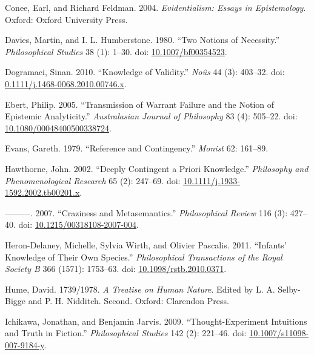 \documentclass[
  10pt,
  letterpaper,
  DIV=11,
  numbers=noendperiod,
  twoside]{scrartcl}
\newlength{\cslhangindent}
\newenvironment{CSLReferences}[2] %
 {\begin{list}{}{%
  \setlength{\itemindent}{0pt}
  \setlength{\leftmargin}{0pt}
  \setlength{\parsep}{0pt}
  \ifodd #1
   \setlength{\leftmargin}{\cslhangindent}
   \setlength{\itemindent}{-1\cslhangindent}
  \fi
  \setlength{\itemsep}{#2\baselineskip}}}
 {\end{list}}
\begin{document}
\begin{CSLReferences}{1}{0}
Conee, Earl, and Richard Feldman. 2004. \emph{Evidentialism: Essays in
Epistemology}. Oxford: Oxford University Press.

Davies, Martin, and I. L. Humberstone. 1980. {``Two Notions of
Necessity.''} \emph{Philosophical Studies} 38 (1): 1--30. doi:
\href{https://doi.org/10.1007/bf00354523}{10.1007/bf00354523}.

Dogramaci, Sinan. 2010. {``Knowledge of Validity.''} \emph{No{û}s} 44
(3): 403--32. doi:
\href{https://doi.org/0.1111/j.1468-0068.2010.00746.x}{0.1111/j.1468-0068.2010.00746.x}.

Ebert, Philip. 2005. {``Transmission of Warrant Failure and the Notion
of Epistemic Analyticity.''} \emph{Australasian Journal of Philosophy}
83 (4): 505--22. doi:
\href{https://doi.org/10.1080/00048400500338724}{10.1080/00048400500338724}.

Evans, Gareth. 1979. {``Reference and Contingency.''} \emph{Monist} 62:
161--89.

Hawthorne, John. 2002. {``Deeply Contingent a Priori Knowledge.''}
\emph{Philosophy and Phenomenological Research} 65 (2): 247--69. doi:
\href{https://doi.org/10.1111/j.1933-1592.2002.tb00201.x}{10.1111/j.1933-1592.2002.tb00201.x}.

---------. 2007. {``Craziness and Metasemantics.''} \emph{Philosophical
Review} 116 (3): 427--40. doi:
\href{https://doi.org/10.1215/00318108-2007-004}{10.1215/00318108-2007-004}.

Heron-Delaney, Michelle, Sylvia Wirth, and Olivier Pascalis. 2011.
{``Infants' Knowledge of Their Own Species.''} \emph{Philosophical
Transactions of the Royal Society B} 366 (1571): 1753--63. doi:
\href{https://doi.org/10.1098/rstb.2010.0371}{10.1098/rstb.2010.0371}.

Hume, David. 1739/1978. \emph{A Treatise on Human Nature}. Edited by L.
A. Selby-Bigge and P. H. Nidditch. Second. Oxford: Clarendon Press.

Ichikawa, Jonathan, and Benjamin Jarvis. 2009. {``Thought-Experiment
Intuitions and Truth in Fiction.''} \emph{Philosophical Studies} 142
(2): 221--46. doi:
\href{https://doi.org/10.1007/s11098-007-9184-y}{10.1007/s11098-007-9184-y}.


\end{CSLReferences}
\end{document}
